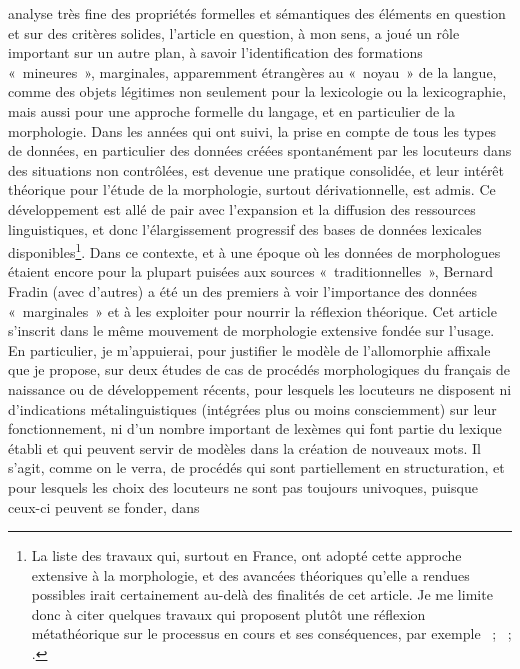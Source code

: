 \documentclass[output=paper]{langsci/langscibook}
\begin{document}
analyse très fine des propriétés formelles et sémantiques des éléments
en question et sur des critères solides, l'article en question, à mon
sens, a joué un rôle important sur un autre plan, à savoir
l'identification des formations «~mineures~», marginales, apparemment
étrangères au «~noyau~» de la langue, comme des objets légitimes non
seulement pour la lexicologie ou la lexicographie, mais aussi pour une
approche formelle du langage, et en particulier de la morphologie. Dans
les années qui ont suivi, la prise en compte de tous les types de
données, en particulier des données créées spontanément par les
locuteurs dans des situations non contrôlées, est devenue une pratique
consolidée, et leur intérêt théorique pour l'étude de la morphologie,
surtout dérivationnelle, est admis. Ce développement est allé de pair
avec l'expansion et la diffusion des ressources linguistiques, et donc
l'élargissement progressif des bases de données lexicales
disponibles\footnote{La liste des travaux qui, surtout en France, ont
  adopté cette approche extensive à la morphologie, et des avancées
  théoriques qu'elle a rendues possibles irait certainement au-delà des
  finalités de cet article. Je me limite donc à citer quelques travaux
  qui proposent plutôt une réflexion métathéorique sur le processus en
  cours et ses conséquences, par exemple %
\citet{Hathout2008}%
%
~;
\citet{Hathout2009}%
%
~; %
\citet{Dal2012,DalGeorgette2016}%
%
.}. Dans ce
contexte, et à une époque où les données de morphologues étaient encore
pour la plupart puisées aux sources «~traditionnelles~», Bernard Fradin
(avec d'autres) a été un des premiers à voir l'importance des données
«~marginales~» et à les exploiter pour nourrir la réflexion théorique. Cet
article s'inscrit dans le même mouvement de morphologie extensive fondée
sur l'usage. En particulier, je m'appuierai, pour justifier le modèle de
l'allomorphie affixale que je propose, sur deux études de cas de
procédés morphologiques du français de naissance ou de développement
récents, pour lesquels les locuteurs ne disposent ni d'indications
métalinguistiques (intégrées plus ou moins consciemment) sur leur
fonctionnement, ni d'un nombre important de lexèmes qui font partie du
lexique établi et qui peuvent servir de modèles dans la création de
nouveaux mots. Il s'agit, comme on le verra, de procédés qui sont
partiellement en structuration, et pour lesquels les choix des locuteurs
ne sont pas toujours univoques, puisque ceux-ci peuvent se fonder, dans
\end{document}

